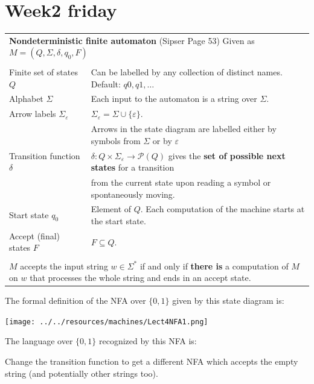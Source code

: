 \documentclass[12pt, oneside]{article}
\begin{document}
\section*{Week2 friday}



\begin{center}
\begin{tabular}{|ll|}
\hline
\multicolumn{2}{|l|}{{\bf Nondeterministic finite automaton}  (Sipser Page 53) Given as $M = (Q, \Sigma, \delta, q_0, F)$}\\
& \\
Finite set of states $Q$  & Can  be labelled by any collection  of distinct names. Default: $q0, q1, \ldots$  \\
Alphabet $\Sigma$ &  Each input to the automaton is a string over  $\Sigma$. \\
Arrow labels $\Sigma_\varepsilon$ &  $\Sigma_\varepsilon = \Sigma \cup \{ \varepsilon\}$. \\
&  Arrows 
in the state diagram are labelled either by symbols from $\Sigma$ or by $\varepsilon$ \\
Transition function $\delta$  & $\delta: Q \times \Sigma_{\varepsilon} \to \mathcal{P}(Q)$
gives the {\bf set of possible next states} for a transition \\
&  from the current state upon reading a symbol or spontaneously moving.\\
Start state $q_0$ & Element of $Q$.  Each computation of the machine starts at the  start  state.\\
Accept (final) states $F$ & $F \subseteq  Q$.\\
& \\
\multicolumn{2}{|p{\textwidth}|}{$M$ accepts the input string $w \in \Sigma^*$ if and only if {\bf there is} a computation of $M$ on 
$w$ that processes the whole string and ends in an
accept state.}\\
\hline
\end{tabular}
\end{center}

The formal definition of the NFA over $\{0,1\}$ given by this state diagram is: 

\texttt{[image: ../../resources/machines/Lect4NFA1.png]}

The language over $\{0,1\}$ recognized by this NFA is:

\vspace{70pt}

Change the transition function to get a different NFA which accepts
the empty string (and potentially other strings too).
\end{document}
